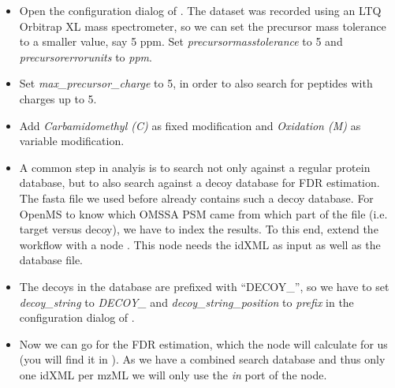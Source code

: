\begin{itemize}
\item
Open the configuration dialog of .
The dataset was recorded using an LTQ Orbitrap XL mass spectrometer, so we can set the precursor mass tolerance to a smaller value, say 5 ppm.
Set \textit{precursor\textunderscore mass\textunderscore tolerance} to 5 and \\ \textit{precursor\textunderscore error\textunderscore units} to \textit{ppm}.
\item
Set \textit{max\_precursor\_charge} to 5, in order to also search for peptides with charges up to 5.
\item
Add \textit{Carbamidomethyl (C)} as fixed modification and \textit{Oxidation (M)} as variable modification.
\item
A common step in analyis is to search not only against a regular protein database, but to also search against a decoy database for FDR estimation.
The fasta file we used before already contains such a decoy database.
For OpenMS to know which OMSSA PSM came from which part of the file (i.e. target versus decoy), we have to index the results.
To this end, extend the workflow with a  node .
This node needs the idXML as input as well as the database file.
\item
The decoys in the database are prefixed with ``DECOY\_'', so we have to set \textit{decoy\_string} to \textit{DECOY\_} and \textit{decoy\_string\_position} to \textit{prefix} in the configuration dialog of .
\item
Now we can go for the FDR estimation, which the  node will calculate for us (you will find it in ).
As we have a combined search database and thus only one idXML per mzML we will only use the \textit{in} port of the  node.

\end{itemize}
